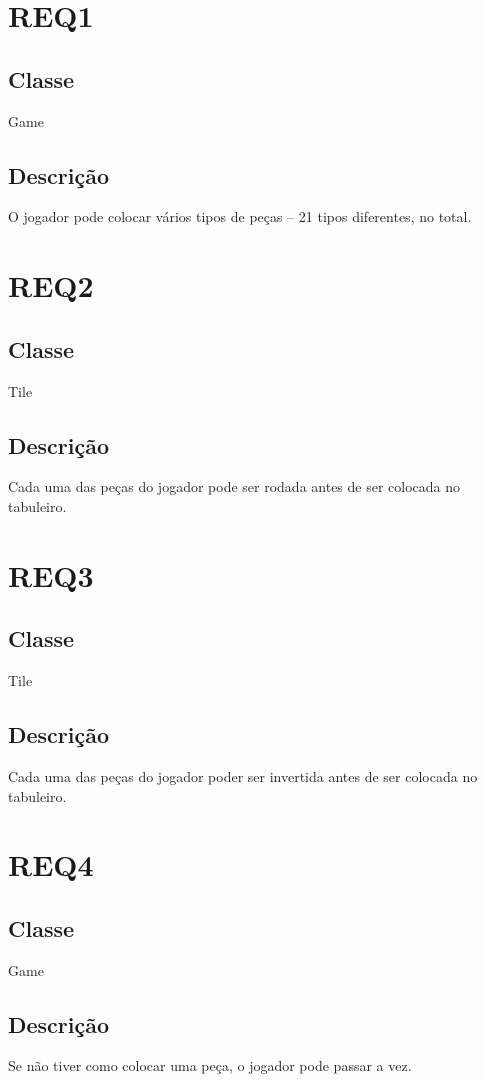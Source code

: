 \section{REQ1}
\subsection{Classe}
Game
\subsection{Descrição}
O jogador pode colocar vários tipos de peças – 21 tipos diferentes, no total.

\section{REQ2}
\subsection{Classe}
Tile
\subsection{Descrição}
Cada uma das peças do jogador pode ser rodada antes de ser colocada no tabuleiro.

\section{REQ3}
\subsection{Classe}
Tile
\subsection{Descrição}
Cada uma das peças do jogador poder ser invertida antes de ser colocada no tabuleiro.

\section{REQ4}
\subsection{Classe}
Game
\subsection{Descrição}
Se não tiver como colocar uma peça, o jogador pode passar a vez.

